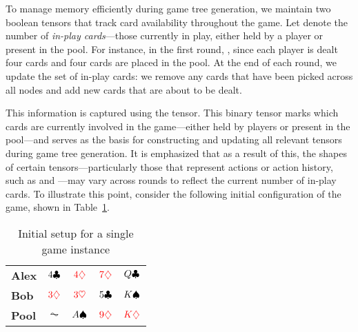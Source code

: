To manage memory efficiently during game tree generation, we maintain two boolean tensors that track card availability throughout the game. Let  denote the number of \emph{in-play cards}—those currently in play, either held by a player or present in the pool. For instance, in the first round, , since each player is dealt four cards and four cards are placed in the pool. At the end of each round, we update the set of in-play cards: we remove any cards that have been picked across all nodes and add new cards that are about to be dealt. 

This information is captured using the  tensor. This binary tensor marks which cards are currently involved in the game—either held by players or present in the pool—and serves as the basis for constructing and updating all relevant tensors during game tree generation. It is emphasized that as a result of this, the shapes of certain tensors—particularly those that represent actions or action history, such as  and —may vary across rounds to reflect the current number of in-play cards. To illustrate this point, consider the following initial configuration of the game, shown in Table~\ref{table:deck9}. 
\begin{table}[h!]
\centering
\caption{Initial setup for a single game instance}
\label{table:deck9}
\begin{tabular}{lcccc}
\toprule
\textbf{Alex} & $\textcolor{black}{4\clubsuit}$ & $\textcolor{red}{4\diamondsuit}$ & $\textcolor{red}{7\diamondsuit}$ & $\textcolor{black}{Q\clubsuit}$ \\
\textbf{Bob} & $\textcolor{red}{3\diamondsuit}$ & $\textcolor{red}{3\heartsuit}$ & $\textcolor{black}{5\clubsuit}$ & $\textcolor{black}{K\spadesuit}$ \\
\textbf{Pool} & $\AC$ & $\textcolor{black}{A\spadesuit}$ & $\textcolor{red}{9\diamondsuit}$ & $\textcolor{red}{K\diamondsuit}$ \\
\bottomrule
\end{tabular}
\end{table}
